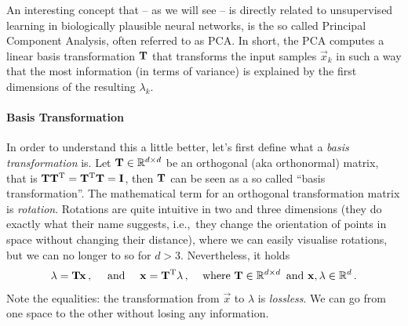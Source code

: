 \documentclass[10pt,letterpaper,oneside]{article}
\begin{document}
An interesting concept that -- as we will see -- is directly related to unsupervised learning in biologically plausible neural networks, is the so called Principal Component Analysis, often referred to as PCA. In short, the PCA computes a linear basis transformation ${\mathbf{T}}$ that transforms the input samples $\vec x_k$ in such a way that the most information (in terms of variance) is explained by the first dimensions of the resulting $\lambda_k$.

\paragraph{Basis Transformation}
In order to understand this a little better, let's first define what a \emph{basis transformation} is. Let ${\mathbf{T}} \in \mathbb{R}^{d \times d}$ be an orthogonal (aka orthonormal) matrix, that is ${\mathbf{T}} {\mathbf{T}}^{\mathrm{T}} = {\mathbf{T}}^{\mathrm{T}} {\mathbf{T}} = {\mathbf{I}}$, then ${\mathbf{T}}$ can be seen as a so called \enquote{basis transformation}. The mathematical term for an orthogonal transformation matrix is \emph{rotation}. Rotations are quite intuitive in two and three dimensions (they do exactly what their name suggests, i.e.,~they change the orientation of points in space without changing their distance), where we can easily visualise rotations, but we can no longer to so for $d > 3$. Nevertheless, it holds
\begin{align*}
	{\mathbf{\lambda}} = {\mathbf{T}} {\mathbf{x}} \,, \quad \text{ and }\quad {\mathbf{x}} = {\mathbf{T}}^{\mathrm{T}} {\mathbf{\lambda}} \,, && \text{ where } {\mathbf{T}} \in \mathbb{R}^{d \times d} \, \text{ and } {\mathbf{x}}, {\mathbf{\lambda}} \in \mathbb{R}^d \,.
\end{align*}
Note the equalities: the transformation from $\vec x$ to $\lambda$ is \emph{lossless}. We can go from one space to the other without losing any information.

\end{document}
